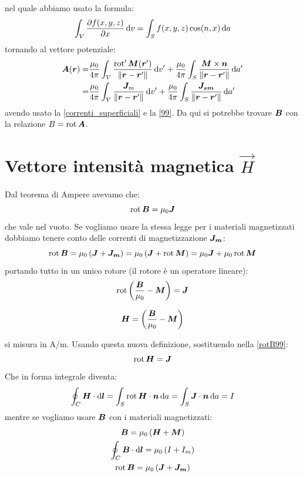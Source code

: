 nel quale abbiamo usato la formula:
\begin{equation}
  \int_V\frac{\partial f(x,y,z)}{\partial x}\,\mathrm{d} v=\int_S f(x,y,z)\cos(n,x)\,\mathrm{d} a
\end{equation}
tornando al vettore potenziale:
\begin{equation}
  \begin{split}
    \boldsymbol{A}(\boldsymbol{r})=&\frac{\mu_0}{4\pi}\int_V\frac{\operatorname{rot}'\boldsymbol{M}(\boldsymbol{r}')}{\left\lVert\boldsymbol{r}-\boldsymbol{r}'\right\rVert}\,\mathrm{d} v'+\frac{\mu_0}{4\pi}\int_S\frac{\boldsymbol{M}\times\boldsymbol{n}}{\left\lVert\boldsymbol{r}-\boldsymbol{r}'\right\rVert}\,\mathrm{d} a'\\
    =&\frac{\mu_0}{4\pi}\int_V\frac{\boldsymbol{J}_m}{\left\lVert\boldsymbol{r}-\boldsymbol{r}'\right\rVert}\,\mathrm{d} v'+\frac{\mu_0}{4\pi}\int_S\frac{\boldsymbol{J_{sm}}}{\left\lVert\boldsymbol{r}-\boldsymbol{r}'\right\rVert}\,\mathrm{d} a'
  \end{split}
\end{equation}
avendo usato la \eqref{correnti_superficiali} e la \eqref{99}. Da qui si potrebbe trovare $\boldsymbol{B}$ con la relazione $B=\operatorname{rot}\boldsymbol{A}$.
\section{Vettore intensità magnetica \texorpdfstring{$\vec H$}{H}}
Dal teorema di Ampere avevamo che:
\begin{equation}
  \operatorname{rot}\boldsymbol{B}=\mu_0\boldsymbol{J}
\end{equation}
che vale nel vuoto. Se vogliamo usare la stessa legge per i materiali magnetizzati dobbiamo tenere conto delle correnti di magnetizzazione $\boldsymbol{J_m}$:
\begin{equation}
  \operatorname{rot}\boldsymbol{B}=\mu_0\left(\boldsymbol{J}+\boldsymbol{J_m}\right)=\mu_0\left(\boldsymbol{J}+\operatorname{rot}\boldsymbol{M}\right)=\mu_0\boldsymbol{J}+\mu_0\operatorname{rot}\boldsymbol{M}
\end{equation}
portando tutto in un unico rotore (il rotore è un operatore lineare):
\begin{equation}
  \operatorname{rot}\left(\frac{\boldsymbol{B}}{\mu_0}-\boldsymbol{M}\right)=\boldsymbol{J}
  \label{rotB99}
\end{equation}
\begin{Def}
  \begin{equation}
    \boldsymbol{H}=\left(\frac{\boldsymbol{B}}{\mu_0}-\boldsymbol{M}\right)
  \end{equation}
\end{Def}
si misura in $\si{\ampere\per\meter}$. Usando questa nuova definizione, sostituendo nella \eqref{rotB99}:
\begin{equation}
  \operatorname{rot}\boldsymbol{H}=\boldsymbol{J}
\end{equation}
Che in forma integrale diventa:
\begin{equation}
  \oint_C\boldsymbol{H}\cdot\mathrm{d}\boldsymbol{l}=\int_S\operatorname{rot} \boldsymbol{H}\cdot\boldsymbol{n}\,\mathrm{d} a=\int_S\boldsymbol{J}\cdot\boldsymbol{n}\,\mathrm{d} a=I
\end{equation}
mentre se vogliamo usare $\boldsymbol{B}$ con i materiali magnetizzati:
\begin{gather}
  \boldsymbol{B}=\mu_0\left(\boldsymbol{H}+\boldsymbol{M}\right)\\
  \oint_C\boldsymbol{B}\cdot\mathrm{d}\boldsymbol{l}=\mu_0\left(I+I_m\right)\\
  \operatorname{rot}\boldsymbol{B}=\mu_0\left(\boldsymbol{J}+\boldsymbol{J_m}\right)
\end{gather}

